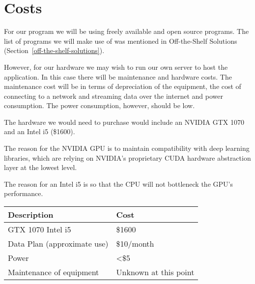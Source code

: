 \documentclass{scrreprt}
\begin{document}
\section{Costs}

{For our program we will be using freely available and open source programs.
The list of programs we will make use of was mentioned in Off-the-Shelf
Solutions (Section~\ref{off-the-shelf-solutions}).}

{However, for our hardware we may wish to run our own server to host the
application. In this case there will be maintenance and hardware costs.  The
maintenance cost will be in terms of depreciation of the equipment, the cost of
connecting to a network and streaming data over the internet and power
consumption. The power consumption, however, should be low.}

The hardware we would need to purchase would include an NVIDIA GTX 1070 and an
Intel i5 (\$1600).

The reason for the NVIDIA GPU is to maintain compatibility with deep learning
libraries, which are relying on NVIDIA's proprietary CUDA hardware abstraction
layer at the lowest level.

The reason for an Intel i5 is so that the CPU will not bottleneck the GPU's
performance.

\begin{longtable}[c]{@{}ll@{}}
\toprule
\begin{minipage}[t]{0.47\columnwidth}\raggedright\strut
{Description}
\strut\end{minipage} &
\begin{minipage}[t]{0.47\columnwidth}\raggedright\strut
{Cost}
\strut\end{minipage}\tabularnewline\midrule
\begin{minipage}[t]{0.47\columnwidth}\raggedright\strut
{GTX 1070 Intel i5}
\strut\end{minipage} &
\begin{minipage}[t]{0.47\columnwidth}\raggedright\strut
{\$1600}
\strut\end{minipage}\tabularnewline
\begin{minipage}[t]{0.47\columnwidth}\raggedright\strut
{Data Plan (approximate use)}
\strut\end{minipage} &
\begin{minipage}[t]{0.47\columnwidth}\raggedright\strut
{\$10/month}
\strut\end{minipage}\tabularnewline
\begin{minipage}[t]{0.47\columnwidth}\raggedright\strut
{Power}
\strut\end{minipage} &
\begin{minipage}[t]{0.47\columnwidth}\raggedright\strut
{\textless{}\$5}
\strut\end{minipage}\tabularnewline
\begin{minipage}[t]{0.47\columnwidth}\raggedright\strut
{Maintenance of equipment}
\strut\end{minipage} &
\begin{minipage}[t]{0.47\columnwidth}\raggedright\strut
{Unknown at this point}
\strut\end{minipage}\tabularnewline
\bottomrule
\end{longtable}
\end{document}
